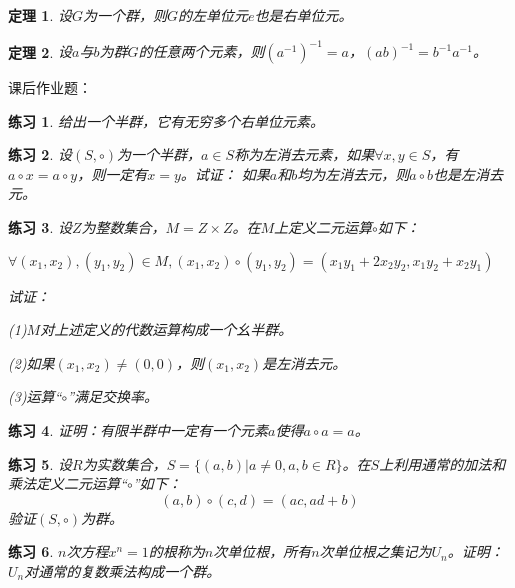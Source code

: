 \documentclass{article}
\newtheorem{Thm}{定理}
\newtheorem{Exercise}{练习}
\begin{document}
\begin{CJK*}{UTF8}{gbsn}
\begin{Thm}
  设$G$为一个群，则$G$的左单位元$e$也是右单位元。
\end{Thm}

\begin{Thm}
  设$a$与$b$为群$G$的任意两个元素，则$(a^{-1})^{-1}=a$，$(ab)^{-1}=b^{-1}a^{-1}$。
\end{Thm}

  课后作业题：

\begin{Exercise}
  给出一个半群，它有无穷多个右单位元素。
\end{Exercise}

\begin{Exercise}
  设$(S,\circ)$为一个半群，$a\in S$称为左消去元素，如果$\forall x, y\in S$，有$a\circ x=a\circ y$，则一定有$x=y$。试证：
  如果$a$和$b$均为左消去元，则$a\circ b$也是左消去元。
\end{Exercise}

\begin{Exercise}
  设$Z$为整数集合，$M=Z\times Z$。在$M$上定义二元运算$\circ$如下：

  $\forall (x_1,x_2), (y_1,y_2)\in M, (x_1,x_2)\circ (y_1,y_2)=(x_1y_1+2x_2y_2,x_1y_2+x_2y_1)$

  试证：

  (1)$M$对上述定义的代数运算构成一个幺半群。

  (2)如果$(x_1,x_2)\neq (0,0)$，则$(x_1,x_2)$是左消去元。

  (3)运算“$\circ$”满足交换率。
\end{Exercise}


\begin{Exercise}
  证明：有限半群中一定有一个元素$a$使得$a\circ a=a$。
\end{Exercise}


\begin{Exercise}
  设$R$为实数集合，$S=\{(a,b)|a\neq 0,a,b\in R\}$。在$S$上利用通常的加法和乘法定义二元运算“$\circ$”如下：
  \[(a,b)\circ (c,d) = (ac, ad + b)\]
  验证$(S,\circ)$为群。
\end{Exercise}

\begin{Exercise}
  $n$次方程$x^n=1$的根称为$n$次单位根，所有$n$次单位根之集记为$U_n$。证明：$U_n$对通常的复数乘法构成一个群。
\end{Exercise}



\end{CJK*}
\end{document}
